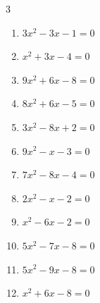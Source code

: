 \begin{multicols}{3}
\begin{enumerate}

  \item $3x^{2}-3x-1=0$


  \item $x^{2}+3x-4=0$

        \phantom{$\displaystyle x=1, \; -4$}

  \item $9x^{2}+6x-8=0$


  \item $8x^{2}+6x-5=0$


  \item $3x^{2}-8x+2=0$


\columnbreak %

\resetques

  \item $9x^{2}-x-3=0$


  \item $7x^{2}-8x-4=0$


  \item $2x^{2}-x-2=0$


  \item $x^{2}-6x-2=0$


  \item $5x^{2}-7x-8=0$


  \item $5x^{2}-9x-8=0$


  \item $x^{2}+6x-8=0$



\end{enumerate}
\end{multicols}

